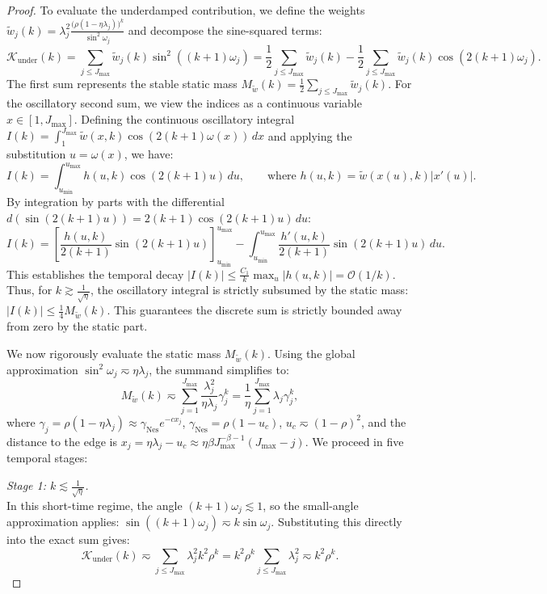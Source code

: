 \begin{proof}
To evaluate the underdamped contribution, we define the weights $\tilde{w}_j(k) = \lambda_j^2 \frac{\bigl(\rho(1-\eta\lambda_j)\bigr)^k}{\sin^2\omega_j}$ and decompose the sine-squared terms:
\[
    \mathcal{K}_{\mathrm{under}}(k) = \sum_{j \le J_{\max}} \tilde{w}_j(k) \sin^2((k+1)\omega_j) = \frac{1}{2} \sum_{j \le J_{\max}} \tilde{w}_j(k) - \frac{1}{2} \sum_{j \le J_{\max}} \tilde{w}_j(k) \cos(2(k+1)\omega_j).
\]
The first sum represents the stable static mass $M_{\tilde{w}}(k) = \frac{1}{2} \sum_{j \le J_{\max}} \tilde{w}_j(k)$. For the oscillatory second sum, we view the indices as a continuous variable $x \in [1, J_{\max}]$. Defining the continuous oscillatory integral $I(k) = \int_{1}^{J_{\max}} \tilde{w}(x, k) \cos(2(k+1)\omega(x)) \, dx$ and applying the substitution $u = \omega(x)$, we have:
\[
    I(k) = \int_{u_{\min}}^{u_{\max}} h(u, k) \cos(2(k+1)u) \, du, \qquad \text{where } h(u, k) = \tilde{w}(x(u), k) \left| x'(u) \right|.
\]
By integration by parts with the differential $d\left(\sin(2(k+1)u)\right) = 2(k+1) \cos(2(k+1)u) \, du$:
\[
    I(k) = \left[ \frac{h(u, k)}{2(k+1)} \sin(2(k+1)u) \right]_{u_{\min}}^{u_{\max}} - \int_{u_{\min}}^{u_{\max}} \frac{h'(u, k)}{2(k+1)} \sin(2(k+1)u) \, du.
\]
This establishes the temporal decay $|I(k)| \le \frac{C_1}{k} \max_u |h(u, k)| = \mathcal{O}(1/k)$. Thus, for $k \gtrsim \frac{1}{\sqrt{\eta}}$, the oscillatory integral is strictly subsumed by the static mass: $|I(k)| \le \frac{1}{4} M_{\tilde{w}}(k)$. This guarantees the discrete sum is strictly bounded away from zero by the static part.

We now rigorously evaluate the static mass $M_{\tilde{w}}(k)$. Using the global approximation $\sin^2\omega_j \eqsim \eta\lambda_j$, the summand simplifies to:
\[
    M_{\tilde{w}}(k) \eqsim \sum_{j=1}^{J_{\max}} \frac{\lambda_j^2}{\eta\lambda_j} \gamma_j^k = \frac{1}{\eta} \sum_{j=1}^{J_{\max}} \lambda_j \gamma_j^k,
\]
where $\gamma_j = \rho(1-\eta\lambda_j) \approx \gamma_{\mathrm{Nes}} e^{-c x_j}$, $\gamma_{\mathrm{Nes}} = \rho(1-u_c)$, $u_c \eqsim (1-\rho)^2$, and the distance to the edge is $x_j = \eta\lambda_j - u_c \approx \eta\beta J_{\max}^{-\beta-1}(J_{\max} - j)$. We proceed in five temporal stages:

\textit{Stage 1: $k \lesssim \frac{1}{\sqrt{\eta}}$.} \\
In this short-time regime, the angle $(k+1)\omega_j \lesssim 1$, so the small-angle approximation applies: $\sin((k+1)\omega_j) \eqsim k\sin\omega_j$.
Substituting this directly into the exact sum gives:
\[
    \mathcal K_{\mathrm{under}}(k) \eqsim \sum_{j \le J_{\max}} \lambda_j^2 k^2 \rho^k = k^2 \rho^k \sum_{j \le J_{\max}} \lambda_j^2 \eqsim k^2 \rho^k.
\]


\end{proof}
